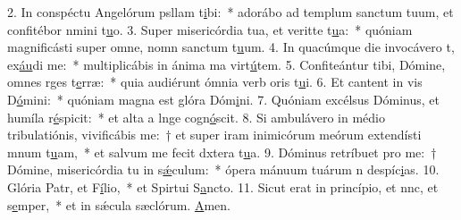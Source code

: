 2. In conspéctu Angelórum psllam t\uline{i}bi:~* adorábo ad templum sanctum tuum, et confitébor nmini t\uline{u}o.
3. Super misericórdia tua, et veritte t\uline{u}a:~* quóniam magnificásti super omne, nomn sanctum t\uline{u}um.
4. In quacúmque die invocávero t, ex\uline{áu}di me:~* multiplicábis in ánima ma virt\uline{ú}tem.
5. Confiteántur tibi, Dómine, omnes rges t\uline{e}rræ:~* quia audiérunt ómnia verb oris t\uline{u}i.
6. Et cantent in vis D\uline{ó}mini:~* quóniam magna est glóra Dóm\uline{i}ni.
7. Quóniam excélsus Dóminus, et humíla r\uline{é}spicit:~* et alta a lnge cogn\uline{ó}scit.
8. Si ambulávero in médio tribulatiónis, vivificábis me:~† et super iram inimicórum meórum extendísti mnum t\uline{u}am,~* et salvum me fecit dxtera t\uline{u}a.
9. Dóminus retríbuet pro me:~† Dómine, misericórdia tu in s\uline{ǽ}culum:~* ópera mánuum tuárum n despíc\uline{i}as.
10. Glória Patr, et F\uline{í}lio,~* et Spirtui S\uline{a}ncto.
11. Sicut erat in princípio, et nnc, et s\uline{e}mper,~* et in sǽcula sæclórum. \uline{A}men.
